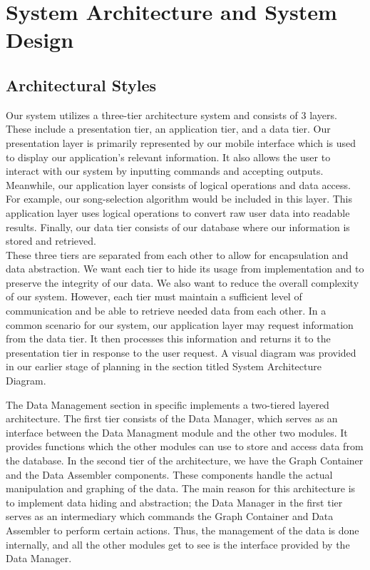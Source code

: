 \documentclass[letterpaper,english, 12pt]{scrreprt}
\begin{document}
\chapter{System Architecture and System Design}

\section{Architectural Styles}

Our system utilizes a three-tier architecture system and consists of 3 layers. These include a presentation tier, an application tier, and a data tier. Our presentation layer is primarily represented by our mobile interface which is used to display our application’s relevant information. It also allows the user to interact with our system by inputting commands and accepting outputs. Meanwhile, our application layer consists of logical operations and data access. For example, our song-selection algorithm would be included in this layer. This application layer uses logical operations to convert raw user data into readable results. Finally, our data tier consists of our database where our information is stored and retrieved. \\

These three tiers are separated from each other to allow for encapsulation and data abstraction. We want each tier to hide its usage from implementation and to preserve the integrity of our data. We also want to reduce the overall complexity of our system. However, each tier must maintain a sufficient level of communication and be able to retrieve needed data from each other. In a common scenario for our system, our application layer may request information from the data tier. It then processes this information and returns it to the presentation tier in response to the user request. A visual diagram was provided in our earlier stage of planning in the section titled System Architecture Diagram.

The Data Management section in specific implements a two-tiered layered architecture. The first tier consists of the Data Manager, which serves as an interface between the Data Managment module and the other two modules. It provides functions which the other modules can use to store and access data from the database. In the second tier of the architecture, we have the Graph Container and the Data Assembler components. These components handle the actual manipulation and graphing of the data. The main reason for this architecture is to implement data hiding and abstraction; the Data Manager in the first tier serves as an intermediary which commands the Graph Container and Data Assembler to perform certain actions. Thus, the management of the data is done internally, and all the other modules get to see is the interface provided by the Data Manager.
\end{document}
